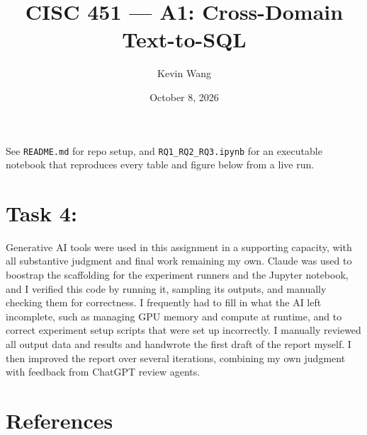 \documentclass[11pt]{article}
\title{CISC 451 --- A1: Cross-Domain Text-to-SQL}
\author{Kevin Wang}
\date{October 8, 2026}
\begin{document}
\maketitle

See \texttt{README.md} for repo setup, and \texttt{RQ1\_RQ2\_RQ3.ipynb} for an executable
notebook that reproduces every table and figure below from a live run.





\section*{Task 4:}

Generative AI tools were used in this assignment in a supporting capacity, with all substantive judgment and final work remaining my own. Claude was used to boostrap the scaffolding for the experiment runners and the Jupyter notebook, and I verified this code by running it, sampling its outputs, and manually checking them for correctness. I frequently had to fill in what the AI left incomplete, such as managing GPU memory and compute at runtime, and to correct experiment setup scripts that were set up incorrectly. I manually reviewed all output data and results and handwrote the first draft of the report myself. I then improved the report over several iterations, combining my own judgment with feedback from ChatGPT review agents.

\section*{References}
\end{document}
